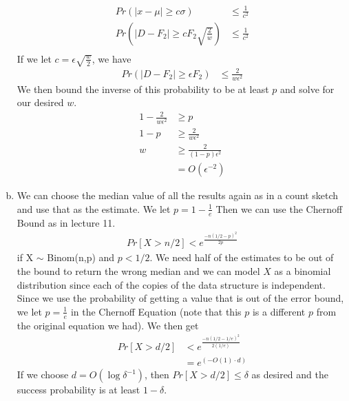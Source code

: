 \documentclass{article}
\theoremstyle{casestyle}
\begin{document}
\begin{enumerate}[a)]
\begin{align*}
  Pr \left(\left|x-\mu\right| \geq c\sigma \right) &\leq \frac{1}{c^2} \\
  Pr \left(\left|D-F_2\right| \geq cF_2\sqrt{\frac{2}{w}} \right) &\leq \frac{1}{c^2} \\
\end{align*} If we let $c=\epsilon\sqrt{\frac{w}{2}}$, we have 
\begin{align*}
  Pr \left(\left|D-F_2\right| \geq \epsilon F_2 \right) &\leq \frac{2}{w\epsilon^2}
\end{align*} We then bound the inverse of this probability to be at least $p$ and solve for our desired $w$.
\begin{align*}
  1 - \frac{2}{w\epsilon^2} &\geq p \\
  1 - p &\geq \frac{2}{w\epsilon^2} \\
  w &\geq \frac{2}{(1-p)\epsilon^2} \\
  &= O(\epsilon^{-2})
\end{align*}
\item We can choose the median value of all the results again as in a count sketch and use that as the estimate. We let $p=1-\frac{1}{e}$ Then we can use the Chernoff Bound as in lecture 11.
\begin{align*}
  Pr\left[ X > n/2 \right] < e^{\frac{-n(1/2-p)^2}{2p}}
\end{align*} if X $\sim$ Binom(n,p) and $p<1/2$. We need half of the estimates to be out of the bound to return the wrong median and we can model $X$ as a binomial distribution since each of the copies of the data structure is independent. Since we use the probability of getting a value that is out of the error bound, we let $p=\frac{1}{e}$ in the Chernoff Equation (note that this $p$ is a different $p$ from the original equation we had). We then get
\begin{align*}
  Pr\left[ X > d/2 \right] &< e^{\frac{-n(1/2-1/e)^2}{2(1/e)}} \\
                           &= e^{(-O(1)\cdot d)}
\end{align*} If we choose $d=O(\log \delta ^{-1})$, then $Pr[X>d/2] \leq \delta$ as desired and the success probability is at least $1-\delta$.
\end{enumerate}
\end{document}
